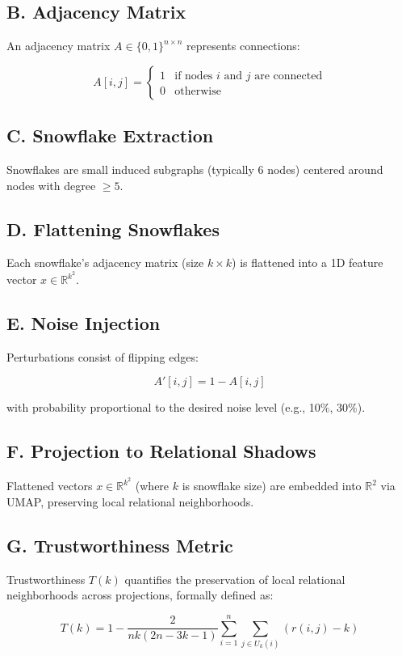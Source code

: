\documentclass[conference]{IEEEtran}
\begin{document}
\subsection*{\textbf{B. Adjacency Matrix}}
An adjacency matrix $A \in \{0,1\}^{n \times n}$ represents connections:

\[
A[i, j] =
\begin{cases}
1 & \text{if nodes } i \text{ and } j \text{ are connected} \\
0 & \text{otherwise}
\end{cases}
\]

\subsection*{\textbf{C. Snowflake Extraction}}
Snowflakes are small induced subgraphs (typically 6 nodes) centered around nodes with degree $\geq 5$.

\subsection*{\textbf{D. Flattening Snowflakes}}
Each snowflake's adjacency matrix (size $k \times k$) is flattened into a 1D feature vector $x \in \mathbb{R}^{k^2}$.

\subsection*{\textbf{E. Noise Injection}}
Perturbations consist of flipping edges:

\[
A'[i, j] = 1 - A[i, j]
\]

with probability proportional to the desired noise level (e.g., 10\%, 30\%).

\subsection*{\textbf{F. Projection to Relational Shadows}}
Flattened vectors $x \in \mathbb{R}^{k^2}$ (where $k$ is snowflake size) are embedded into $\mathbb{R}^{2}$ via UMAP, preserving local relational neighborhoods.

\subsection*{\textbf{G. Trustworthiness Metric}}
Trustworthiness $T(k)$ quantifies the preservation of local relational neighborhoods across projections, formally defined as:

\[
T(k) = 1 - \frac{2}{n k (2n - 3k - 1)} \sum_{i=1}^{n} \sum_{j \in U_k(i)} (r(i, j) - k)
\]
\end{document}

